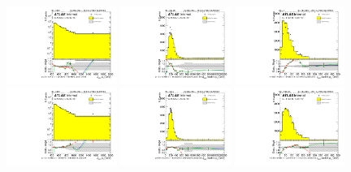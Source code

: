 \begin{figure}[htbp!]
\begin{center}
\includegraphics[angle=270, width=0.32\textwidth]{./figures/boosted/Reweight/Fits/Moriond_NoTag_4Trk_subl_Incl_leadHCand_Pt_m_1.pdf}
\includegraphics[angle=270, width=0.32\textwidth]{./figures/boosted/Reweight/Fits/Moriond_NoTag_4Trk_subl_Incl_leadHCand_trk0_Pt.pdf}
\includegraphics[angle=270, width=0.32\textwidth]{./figures/boosted/Reweight/Fits/Moriond_NoTag_4Trk_subl_Incl_leadHCand_trk1_Pt.pdf} \\
\includegraphics[angle=270, width=0.32\textwidth]{./figures/boosted/Reweight/Fits/Moriond_bkg_0_NoTag_4Trk_subl_Incl_leadHCand_Pt_m_1.pdf}
\includegraphics[angle=270, width=0.32\textwidth]{./figures/boosted/Reweight/Fits/Moriond_bkg_0_NoTag_4Trk_subl_Incl_leadHCand_trk0_Pt.pdf}
\includegraphics[angle=270, width=0.32\textwidth]{./figures/boosted/Reweight/Fits/Moriond_bkg_0_NoTag_4Trk_subl_Incl_leadHCand_trk1_Pt.pdf} \\

\end{center}
\end{figure}

